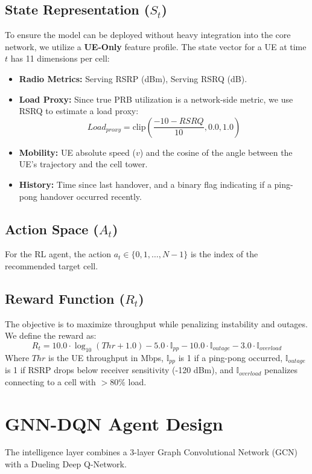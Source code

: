 \documentclass[12pt,a4paper,oneside]{report}
\begin{document}
\subsection{State Representation ($S_t$)}
To ensure the model can be deployed without heavy integration into the core network, we utilize a \textbf{UE-Only} feature profile. The state vector for a UE at time $t$ has 11 dimensions per cell:
\begin{itemize}
    \item \textbf{Radio Metrics:} Serving RSRP (dBm), Serving RSRQ (dB).
    \item \textbf{Load Proxy:} Since true PRB utilization is a network-side metric, we use RSRQ to estimate a load proxy:
    \begin{equation}
        Load_{proxy} = \text{clip}\left( \frac{-10 - RSRQ}{10}, 0.0, 1.0 \right)
    \end{equation}
    \item \textbf{Mobility:} UE absolute speed ($v$) and the cosine of the angle between the UE's trajectory and the cell tower.
    \item \textbf{History:} Time since last handover, and a binary flag indicating if a ping-pong handover occurred recently.
\end{itemize}

\subsection{Action Space ($A_t$)}
For the RL agent, the action $a_t \in \{0, 1, \dots, N-1\}$ is the index of the recommended target cell. 

\subsection{Reward Function ($R_t$)}
The objective is to maximize throughput while penalizing instability and outages. We define the reward as:
\begin{equation}
    R_t = 10.0 \cdot \log_{10}(Thr + 1.0) - 5.0 \cdot \mathbb{I}_{pp} - 10.0 \cdot \mathbb{I}_{outage} - 3.0 \cdot \mathbb{I}_{overload}
\end{equation}
Where $Thr$ is the UE throughput in Mbps, $\mathbb{I}_{pp}$ is 1 if a ping-pong occurred, $\mathbb{I}_{outage}$ is 1 if RSRP drops below receiver sensitivity (-120 dBm), and $\mathbb{I}_{overload}$ penalizes connecting to a cell with $>80\%$ load.

\section{GNN-DQN Agent Design}
The intelligence layer combines a 3-layer Graph Convolutional Network (GCN) with a Dueling Deep Q-Network.
\end{document}
